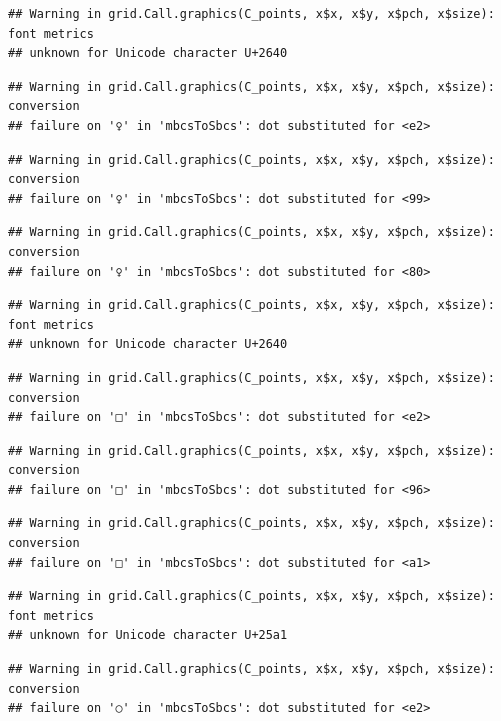 \documentclass[
]{book}
\begin{document}
\begin{verbatim}
## Warning in grid.Call.graphics(C_points, x$x, x$y, x$pch, x$size): font metrics
## unknown for Unicode character U+2640
\end{verbatim}

\begin{verbatim}
## Warning in grid.Call.graphics(C_points, x$x, x$y, x$pch, x$size): conversion
## failure on '♀' in 'mbcsToSbcs': dot substituted for <e2>
\end{verbatim}

\begin{verbatim}
## Warning in grid.Call.graphics(C_points, x$x, x$y, x$pch, x$size): conversion
## failure on '♀' in 'mbcsToSbcs': dot substituted for <99>
\end{verbatim}

\begin{verbatim}
## Warning in grid.Call.graphics(C_points, x$x, x$y, x$pch, x$size): conversion
## failure on '♀' in 'mbcsToSbcs': dot substituted for <80>
\end{verbatim}

\begin{verbatim}
## Warning in grid.Call.graphics(C_points, x$x, x$y, x$pch, x$size): font metrics
## unknown for Unicode character U+2640
\end{verbatim}

\begin{verbatim}
## Warning in grid.Call.graphics(C_points, x$x, x$y, x$pch, x$size): conversion
## failure on '□' in 'mbcsToSbcs': dot substituted for <e2>
\end{verbatim}

\begin{verbatim}
## Warning in grid.Call.graphics(C_points, x$x, x$y, x$pch, x$size): conversion
## failure on '□' in 'mbcsToSbcs': dot substituted for <96>
\end{verbatim}

\begin{verbatim}
## Warning in grid.Call.graphics(C_points, x$x, x$y, x$pch, x$size): conversion
## failure on '□' in 'mbcsToSbcs': dot substituted for <a1>
\end{verbatim}

\begin{verbatim}
## Warning in grid.Call.graphics(C_points, x$x, x$y, x$pch, x$size): font metrics
## unknown for Unicode character U+25a1
\end{verbatim}

\begin{verbatim}
## Warning in grid.Call.graphics(C_points, x$x, x$y, x$pch, x$size): conversion
## failure on '○' in 'mbcsToSbcs': dot substituted for <e2>
\end{verbatim}
\end{document}
